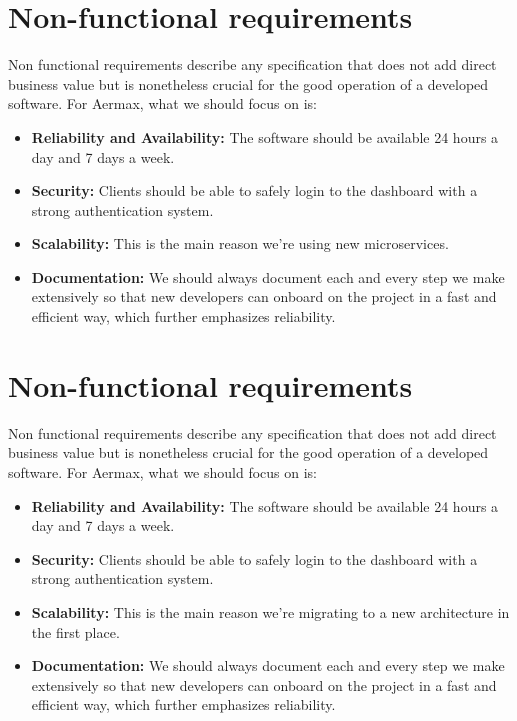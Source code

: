 \section{Non-functional requirements}
Non functional requirements describe any specification that does not add direct business value but is nonetheless crucial for the good operation of a developed software.
For Aermax, what we should focus on is:
\begin{itemize}
	\item \textbf{Reliability and Availability:} The software should be available 24 hours a day and 7 days a week.
	\item \textbf{Security:} Clients should be able to safely login to the dashboard with a strong authentication system.
	\item \textbf{Scalability:} This is the main reason we're using new microservices.
	\item \textbf{Documentation:} We should always document each and every step we make extensively so that new developers can onboard on the project in a fast and efficient way, which further emphasizes reliability.
\end{itemize}

\section{Non-functional requirements}
Non functional requirements describe any specification that does not add direct business value but is nonetheless crucial for the good operation of a developed software.
For Aermax, what we should focus on is:
\begin{itemize}
	\item \textbf{Reliability and Availability:} The software should be available 24 hours a day and 7 days a week.
	\item \textbf{Security:} Clients should be able to safely login to the dashboard with a strong authentication system.
	\item \textbf{Scalability:} This is the main reason we're migrating to a new architecture in the first place.
	\item \textbf{Documentation:} We should always document each and every step we make extensively so that new developers can onboard on the project in a fast and efficient way, which further emphasizes reliability.
\end{itemize}

